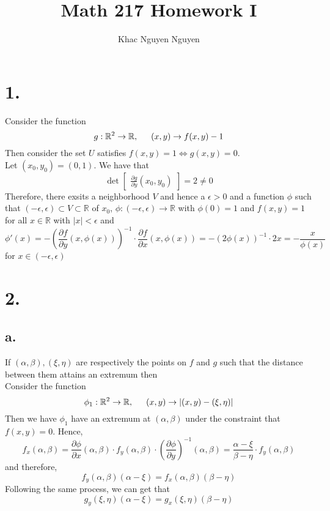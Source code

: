 \documentclass[11pt]{article}
\title{\textbf{Math 217 Homework I}}
\author{Khac Nguyen Nguyen}
\date{}
\begin{document}
\section*{1.}
Consider the function
\[
    g: \mathbb{R}^2 \to \mathbb{R}, \indent (x,y) \to f(x,y)-1
\]
Then consider the set $U$ satisfies $f(x,y) = 1 \iff g(x,y)=0$. \\
Let $(x_0,y_0) = (0,1)$. We have that 
\[
    \det 
    \begin{bmatrix} 
        \frac{\partial g}{\partial y} (x_0,y_0)
    \end{bmatrix} 
    = 2 \ne 0   
\]
Therefore, there exsits a neighborhood $V$ and hence a $\epsilon >0$ and a function $\phi$ such that 
$(-\epsilon, \epsilon) \subset V \subset \mathbb{R}$ of $x_0$, 
$\phi: (-\epsilon, \epsilon) \to \mathbb{R}$ with $\phi(0) = 1$ and $f(x,y) = 1$ for all 
$x\in \mathbb{R}$ with $|x| < \epsilon$ and 
\[
    \phi'(x) = -\left(\frac{\partial f}{\partial y}(x,\phi(x))\right)^{-1} \cdot \frac{\partial f}{\partial x}(x,\phi(x)) = -\left( 2 \phi(x)\right)^{-1} \cdot 2x = -\frac{x}{\phi(x)}    
\]
for $x \in (-\epsilon ,\epsilon )$
\pagebreak
\section*{2.}
\subsection*{a.}
If $(\alpha, \beta), (\xi, \eta)$ are respectively the points on $f$ and $g$ such that 
the distance between them attains an extremum then  \\
Consider the function 
\[
    \phi_1: \mathbb{R}^2 \to \mathbb{R}, \indent (x,y) \to |(x,y)- (\xi, \eta)|
\]
Then we have $\phi_1$ have an extremum at $(\alpha, \beta)$ under the constraint that $f(x,y) = 0$.
Hence, 
\[
    f_x(\alpha,\beta) = \frac{\partial \phi}{\partial x}(\alpha, \beta) \cdot f_y (\alpha, \beta) \cdot \left(\frac{\partial \phi}{\partial y}\right)^{-1}(\alpha, \beta) = \frac{\alpha - \xi}{\beta - \eta} \cdot f_y(\alpha, \beta)  
\]
and therefore, 
\[
    f_y(\alpha, \beta)(\alpha-\xi) = f_x(\alpha, \beta)(\beta - \eta)
\]
Following the same process, we can get that
\[
    g_y(\xi, \eta)(\alpha-\xi) = g_x(\xi, \eta)(\beta - \eta)
\]
\end{document}
